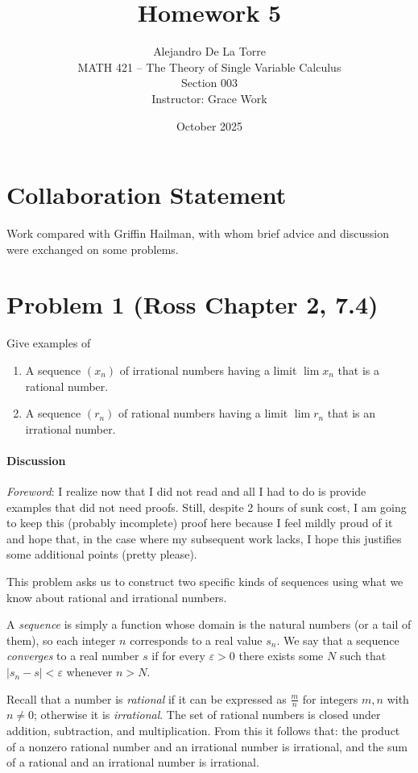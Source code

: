 \documentclass[12pt]{article}
\title{Homework 5}
\author{Alejandro De La Torre \\ MATH 421 -- The Theory of Single Variable Calculus \\ Section 003 \\ Instructor: Grace Work}
\date{October 2025}
\begin{document}
\maketitle

\section*{Collaboration Statement}
Work compared with Griffin Hailman, with whom brief advice and discussion were exchanged on some problems.

\section*{Problem 1 (Ross Chapter 2, 7.4)}
Give examples of

\begin{enumerate}[label=\textbf{(\alph*)}]
  \item A sequence $(x_n)$ of irrational numbers having a limit $\lim x_n$ that is a rational number.
  \item A sequence $(r_n)$ of rational numbers having a limit $\lim r_n$ that is an irrational number.
\end{enumerate}

\paragraph{Discussion}
\textit{Foreword}: I realize now that I did not read and all I had to do is provide examples that did not need proofs. Still, despite 2 hours of sunk cost, I am going to keep this (probably incomplete) proof here because I feel mildly proud of it and hope that, in the case where my subsequent work lacks, I hope this justifies some additional points (pretty please). \smallskip

    This problem asks us to construct two specific kinds of sequences using what we know about rational and irrational numbers.
    
    A \emph{sequence} is simply a function whose domain is the natural numbers (or a tail of them), so each integer $n$ corresponds to a real value $s_n$.  We say that a sequence \emph{converges} to a real number $s$ if for every $\varepsilon>0$ there exists some $N$ such that $|s_n-s|<\varepsilon$ whenever $n>N$.
    
    Recall that a number is \emph{rational} if it can be expressed as $\tfrac{m}{n}$ for integers $m,n$ with $n\neq0$; otherwise it is \emph{irrational}.  The set of rational numbers is closed under addition, subtraction, and multiplication.  From this it follows that:
    the product of a nonzero rational number and an irrational number is irrational, and the sum of a rational and an irrational number is irrational.
    
\end{document}
